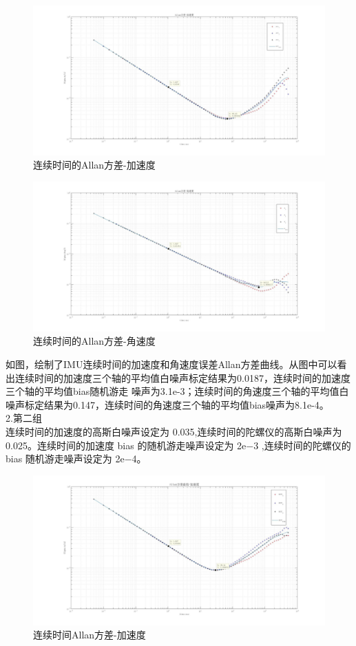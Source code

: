 \documentclass[UTF8]{ctexart}
\begin{document}
\begin{figure}[H]
\centering
\includegraphics[width=1\textwidth]{acc_allan.jpg}    
\caption{连续时间的Allan方差-加速度}
\label{img0}
\end{figure}
\begin{figure}[H]
\centering
\includegraphics[width=1\textwidth]{gyo_allan.jpg}    
\caption{连续时间的Allan方差-角速度}
\label{img1}
\end{figure}
\indent 如图，绘制了IMU连续时间的加速度和角速度误差Allan方差曲线。从图中可以看出连续时间的加速度三个轴的平均值白噪声标定结果为0.0187，连续时间的加速度三个轴的平均值bias随机游走
噪声为3.1e-3；连续时间的角速度三个轴的平均值白噪声标定结果为0.147，连续时间的角速度三个轴的平均值bias噪声为8.1e-4。\\
2.第二组\\
\indent 连续时间的加速度的高斯白噪声设定为 0.035,连续时间的陀螺仪的高斯白噪声为 0.025。连续时间的加速度 bias 的随机游走噪声设定为
2e−3 ,连续时间的陀螺仪的 bias 随机游走噪声设定为 2e−4。\\
\begin{figure}[H]
\centering
\includegraphics[width=1\textwidth]{acc_allan2.jpg}    
\caption{连续时间Allan方差-加速度}
\label{img0}
\end{figure}
\end{document}
